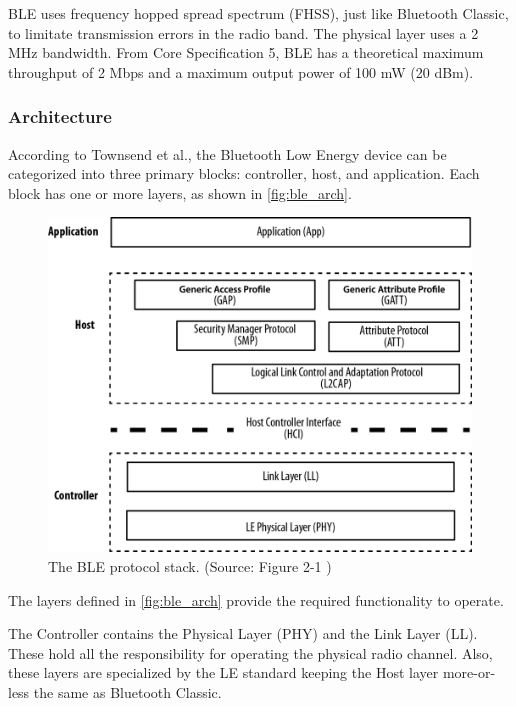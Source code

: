 BLE uses frequency hopped spread spectrum (FHSS), just like Bluetooth Classic,
to limitate transmission errors in the radio band.
The physical layer uses a 2 MHz bandwidth.
From Core Specification 5, BLE has a theoretical maximum throughput of 2 Mbps and
a maximum output power of 100 mW (20 dBm).

\subsubsection{Architecture}
\label{ble:ow}

According to Townsend et al., the Bluetooth Low Energy device can be categorized into
three primary blocks: controller, host, and application.
Each block has one or more layers, as shown in \autoref{fig:ble_arch}.

\begin{figure}[!ht]
    \centering
    \includegraphics[width=150mm, keepaspectratio]{figures/ble_arch_from_townsend.png}
    \caption{The BLE protocol stack. (Source: Figure 2-1 \cite{Townsend14})}
    \label{fig:ble_arch}
\end{figure}

The layers defined in \autoref{fig:ble_arch} provide the required functionality to operate.

The Controller contains the Physical Layer (PHY) and the Link Layer (LL).
These hold all the responsibility for operating the physical radio channel.
Also, these layers are specialized by the LE standard keeping the Host
layer more-or-less the same as Bluetooth Classic.

